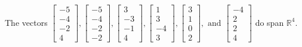 \begin{exercise}
\begin{exerciseStatement}
  \end{exerciseStatement}
  \begin{exerciseAnswer}
   The vectors \(\left[\begin{array}{r}
-5 \\
-4 \\
-2 \\
4
\end{array}\right] , \left[\begin{array}{r}
-5 \\
-4 \\
-2 \\
-2
\end{array}\right] , \left[\begin{array}{r}
3 \\
-3 \\
-1 \\
4
\end{array}\right] , \left[\begin{array}{r}
1 \\
3 \\
-4 \\
3
\end{array}\right] , \left[\begin{array}{r}
3 \\
1 \\
0 \\
2
\end{array}\right] , \text{ and } \left[\begin{array}{r}
-4 \\
2 \\
2 \\
4
\end{array}\right]\) 
  	 do  
	span \(\mathbb{R}^4\).
  


  \end{exerciseAnswer}
\end{exercise}